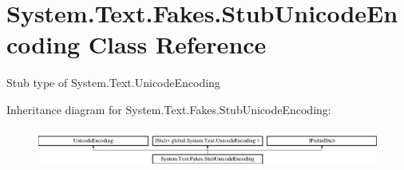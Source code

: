 \hypertarget{class_system_1_1_text_1_1_fakes_1_1_stub_unicode_encoding}{\section{System.\-Text.\-Fakes.\-Stub\-Unicode\-Encoding Class Reference}
\label{class_system_1_1_text_1_1_fakes_1_1_stub_unicode_encoding}
}


Stub type of System.\-Text.\-Unicode\-Encoding 


Inheritance diagram for System.\-Text.\-Fakes.\-Stub\-Unicode\-Encoding\-:\begin{figure}[H]
\begin{center}
\leavevmode
\includegraphics[height=1.333333cm]{class_system_1_1_text_1_1_fakes_1_1_stub_unicode_encoding}
\end{center}
\end{figure}
